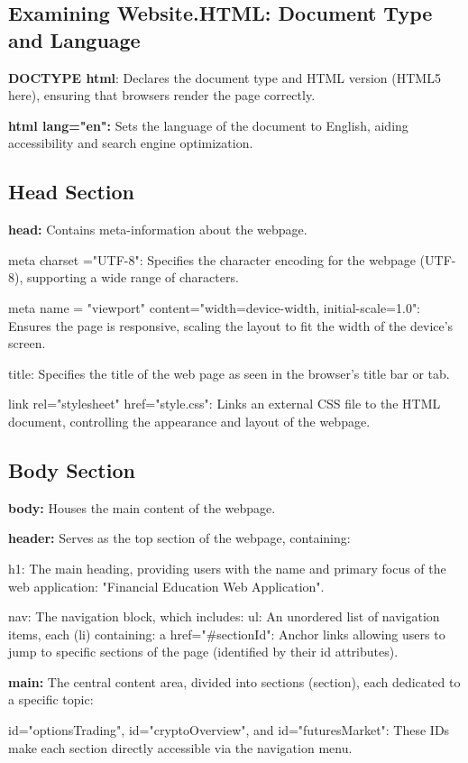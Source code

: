 \documentclass[10pt,twocolumn]{article}
\begin{document}
\subsection{Examining Website.HTML: Document Type and Language}

\textbf{DOCTYPE html}: Declares the document type and HTML version (HTML5 here), ensuring that browsers render the page correctly.

\textbf{html lang="en":} Sets the language of the document to English, aiding accessibility and search engine optimization.

\subsection{Head Section}
\textbf{head:} Contains meta-information about the webpage.

meta charset ="UTF-8": Specifies the character encoding for the webpage (UTF-8), supporting a wide range of characters.

meta name = "viewport" content="width=device-width, initial-scale=1.0": Ensures the page is responsive, scaling the layout to fit the width of the device's screen.

title: Specifies the title of the web page as seen in the browser's title bar or tab.

link rel="stylesheet" href="style.css": Links an external CSS file to the HTML document, controlling the appearance and layout of the webpage.

\subsection{Body Section}
\textbf{body:} Houses the main content of the webpage.

\textbf{header:} Serves as the top section of the webpage, containing:

h1: The main heading, providing users with the name and primary focus of the web application: "Financial Education Web Application".

nav: The navigation block, which includes:
ul: An unordered list of navigation items, each (li) containing:
a href="#sectionId": Anchor links allowing users to jump to specific sections of the page (identified by their id attributes).

\textbf{main: }The central content area, divided into sections (section), each dedicated to a specific topic:

id="optionsTrading", id="cryptoOverview", and id="futuresMarket": These IDs make each section directly accessible via the navigation menu.
\end{document}
